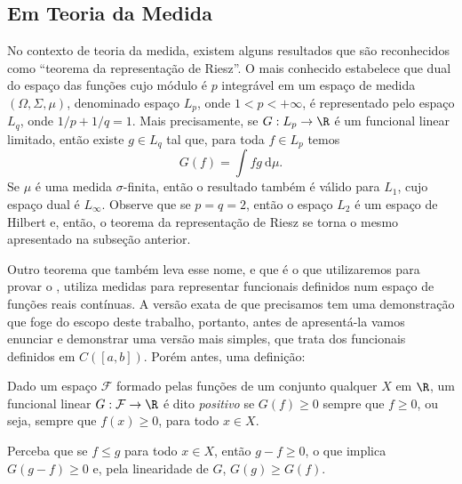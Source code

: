\subsection{Em Teoria da Medida}

No contexto de teoria da medida, existem alguns resultados que são reconhecidos como ``teorema da representação de Riesz''.
O mais conhecido estabelece que dual do espaço das funções cujo módulo é \( p \) integrável em um espaço de medida \( (\Omega, \Sigma, \mu) \), denominado espaço \( L_{ p } \), onde \( 1 < p < +\infty \), é representado pelo espaço \( L_{ q } \), onde \( 1/p + 1/q = 1 \).
Mais precisamente, se \( G : L_{ p } \to \R \) é um funcional linear limitado, então existe \( g \in L_{ q } \) tal que, para toda \( f \in L_{ p } \) temos \[
    G(f) = \int fg \ \mathrm{d}\mu
.\]
Se \( \mu \) é uma medida \( \sigma \)-finita, então o resultado também é válido para \( L_{ 1 } \), cujo espaço dual é \( L_{ \infty } \).
Observe que se \(  p = q = 2 \), então o espaço \( L_{ 2 } \) é um espaço de Hilbert e, então, o teorema da representação de Riesz se torna o mesmo apresentado na subseção anterior.

Outro teorema que também leva esse nome, e que é o que utilizaremos para provar o \uat, utiliza medidas para representar funcionais definidos num espaço de funções reais contínuas.
A versão exata de que precisamos tem uma demonstração que foge do escopo deste trabalho, portanto, antes de apresentá-la vamos enunciar e demonstrar uma versão mais simples, que trata dos funcionais definidos em \( C([a, b]) \).
Porém antes, uma definição:
\begin{defn}
    Dado um espaço \( \mathcal{F} \) formado pelas funções de um conjunto qualquer \( X \) em \( \R \), um funcional linear \( G : \mathcal{F} \to \R \) é dito \emph{positivo} se \( G(f) \geq 0 \) sempre que \( f \geq 0 \), ou seja, sempre que \( f(x) \geq 0 \), para todo \( x \in X \).
\end{defn}

\begin{rem}
    \label{rem: G_crescente}
    Perceba que se \( f \leq g \) para todo \( x \in X \), então \( g-f \geq 0 \), o que implica \( G(g-f) \geq 0 \) e, pela linearidade de \( G \), \( G(g) \geq G(f) \).
\end{rem}

